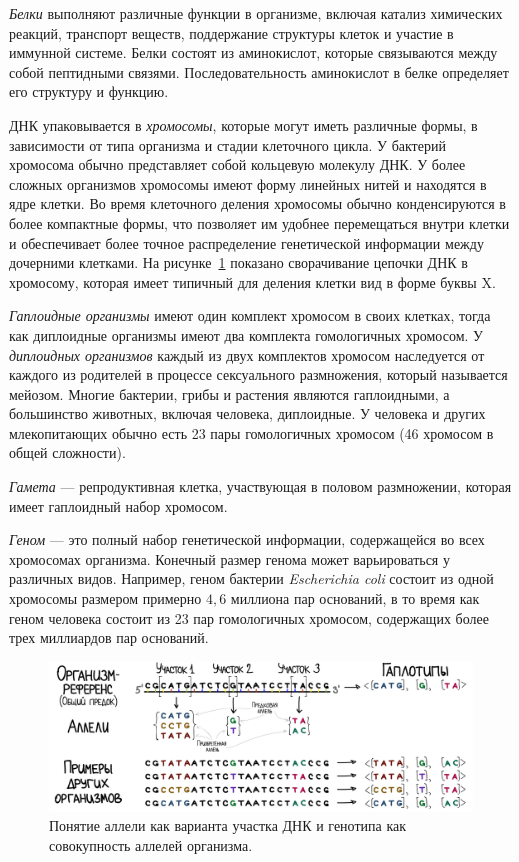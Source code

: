 \emph{Белки} выполняют различные функции в организме, включая катализ химических реакций, транспорт веществ, поддержание структуры клеток и участие в иммунной системе.
Белки состоят из аминокислот, которые связываются между собой пептидными связями.
Последовательность аминокислот в белке определяет его структуру и функцию.

ДНК упаковывается в \emph{хромосомы}, которые могут иметь различные формы, в зависимости от типа организма и стадии клеточного цикла.
У бактерий хромосома обычно представляет собой кольцевую молекулу ДНК. 
У более сложных организмов хромосомы имеют форму линейных нитей и находятся в ядре клетки.
Во время клеточного деления хромосомы обычно конденсируются в более компактные формы, что позволяет им удобнее перемещаться внутри клетки и обеспечивает более точное распределение генетической информации между дочерними клетками.
На рисунке~\ref{fig:part1:bio:genetic_termins} показано сворачивание цепочки ДНК в хромосому, которая имеет типичный для деления клетки вид в форме буквы X.

\emph{Гаплоидные организмы} имеют один комплект хромосом в своих клетках, тогда как диплоидные организмы имеют два комплекта гомологичных хромосом.
У \emph{диплоидных организмов} каждый из двух комплектов хромосом наследуется от каждого из родителей в процессе сексуального размножения, который называется мейозом.
Многие бактерии, грибы и растения являются гаплоидными, а большинство животных, включая человека, диплоидные.
У человека и других млекопитающих обычно есть 23 пары гомологичных хромосом (46 хромосом в общей сложности).

\emph{Гамета} --- репродуктивная клетка, участвующая в половом размножении, которая имеет гаплоидный набор хромосом.

\emph{Геном} --- это полный набор генетической информации, содержащейся во всех хромосомах организма.
Конечный размер генома может варьироваться у различных видов. Например, геном бактерии \textit{Escherichia coli} состоит из одной хромосомы размером примерно $4,6$ миллиона пар оснований, в то время как геном человека состоит из 23 пар гомологичных хромосом, содержащих более трех миллиардов пар оснований.

\begin{figure}
    \centering
    \includegraphics[width=\textwidth]{images/part1/biology/population_genetics.pdf}
    \caption{Понятие аллели как варианта участка ДНК и генотипа как совокупность аллелей организма.}
    \label{fig:part1:bio:genetic_termins}
\end{figure}

